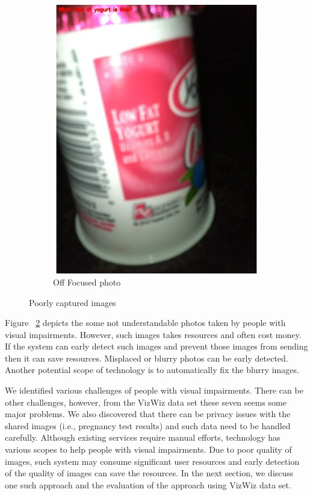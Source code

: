 \documentclass[sigconf]{acmart}
\begin{document}
\begin{figure}[hbp]
\begin{subfigure}[b]{0.3\columnwidth}
                \includegraphics[scale=0.25]{images/off_focus.pdf} 
                 \caption{Off Focused photo}
                 \label{fig:off}
        \end{subfigure}%
        \caption{Poorly captured images} 
        \label{fig:photo}
\end{figure}
Figure ~\ref{fig:photo} depicts the some not understandable photos taken by people with visual impairments. However, such images takes resources and often cost money. If the system can early detect such images and prevent those images from sending then it can save resources. Misplaced or blurry photos can be early detected. Another potential scope of technology is to automatically fix the blurry images. 


We identified various challenges of people with visual impairments. There can be other challenges, however, from the VizWiz data set these seven seems some major problems. We also discovered that there can be privacy issues with the shared images (i.e., pregnancy test results) and such data need to be handled carefully. Although existing services require manual efforts, technology has various scopes to help people with visual impairments. Due to poor quality of images, such system may consume significant user resources and early detection of the quality of images can save the resources. In the next section, we discuss one such approach and the evaluation of the approach using VizWiz data set. 
\end{document}
